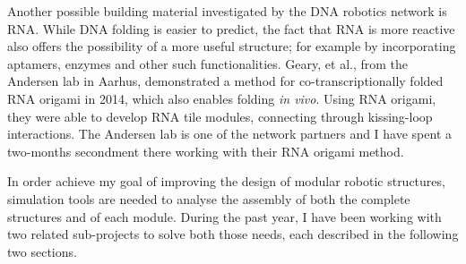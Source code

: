 Another possible building material investigated by the DNA robotics network is RNA. While DNA folding is easier to predict, the fact that RNA is more reactive also offers the possibility of a more useful structure; for example by incorporating aptamers, enzymes and other such functionalities\cite{guo2010emerging}.
Geary, et al., from the Andersen lab in Aarhus, demonstrated a method\cite{geary2014single, sparvath2017computer} for co-transcriptionally folded RNA origami in 2014, which also enables folding \emph{in vivo}. Using RNA origami, they were able to develop RNA tile modules, connecting through kissing-loop interactions. The Andersen lab is one of the network partners and I have spent a two-months secondment there working with their RNA origami method.


In order achieve my goal of improving the design of modular robotic structures, simulation tools are needed to analyse the assembly of both the complete structures and of each module. During the past year, I have been working with two related sub-projects to solve both those needs, each described in the following two sections.

